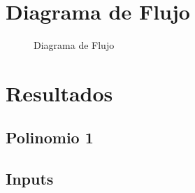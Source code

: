 \documentclass{article}
\begin{document}
\newpage
\section{Diagrama de Flujo}
\begin{figure}[htpb]
	\centering
	
	\caption{Diagrama de Flujo}
\end{figure}
\newpage
\section{Resultados}
\subsection{Polinomio 1}
\subsection{Inputs}
\end{document}

